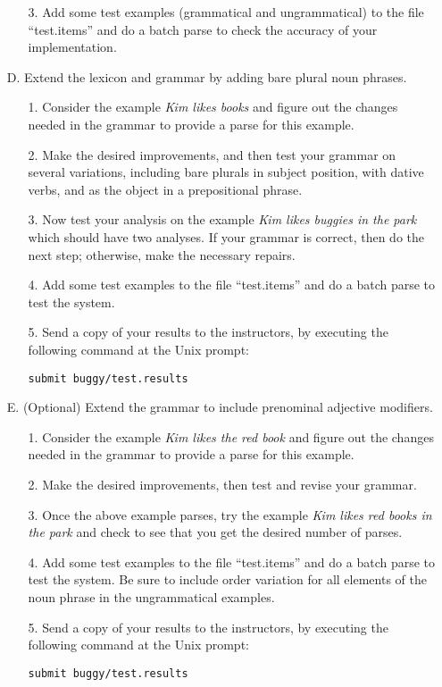 \documentclass[10pt]{article}
\begin{document}
\begin{itemize}
\begin{itemize}
\item[3.] Add some test examples (grammatical and ungrammatical) to the file ``test.items'' and do a batch parse to check the accuracy of your implementation.
\end{itemize}
\item[D.] Extend the lexicon and grammar by adding bare plural noun phrases.
\begin{itemize}
\item[1.] Consider the example \emph{Kim likes books} and figure out the changes needed in the grammar to provide a parse for this example.
\item[2.] Make the desired improvements, and then test your grammar on
several variations, including bare plurals in subject position, with
dative verbs, and as the object in a prepositional phrase.
\item[3.] Now test your analysis on the example \emph{Kim likes buggies in the park} which should have two analyses.  If your grammar is correct, then do the next step; otherwise, make the necessary repairs.
\item[4.] Add some test examples to the file ``test.items'' and do a batch parse to test the system.
\item[5.] Send a copy of your results to the instructors, by executing the
following command at the Unix prompt:
\par\texttt{submit buggy/test.results}
\end{itemize}
\item[E.] (Optional) Extend the grammar to include prenominal adjective modifiers.
\begin{itemize}
\item[1.] Consider the example \emph{Kim likes the red book} and figure out the changes needed in the grammar to provide a parse for this example.
\item[2.] Make the desired improvements, then test and revise your grammar.
\item[3.] Once the above example parses, try the example \emph{Kim likes red books in the park} and check to see that you get the desired number of parses.
\item[4.] Add some test examples to the file ``test.items'' and do a batch parse to test the system.  Be sure to include order variation for all elements of the noun phrase in the ungrammatical examples.
\item[5.] Send a copy of your results to the instructors, by executing the
following command at the Unix prompt:
\par\texttt{submit buggy/test.results}
\end{itemize}
\end{itemize}
\end{document}
